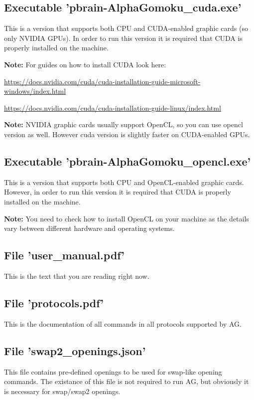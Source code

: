 \documentclass[12pt,a4paper]{article}
\begin{document}
\subsection{Executable 'pbrain-AlphaGomoku{\_}cuda.exe'}
This is a version that supports both CPU and CUDA-enabled graphic cards (so only NVIDIA GPUs). In order to run this version it is required that CUDA is properly installed on the machine.

\textbf{Note:} For guides on how to install CUDA look here:

\href{https://docs.nvidia.com/cuda/cuda-installation-guide-microsoft-windows/index.html}{https://docs.nvidia.com/cuda/cuda-installation-guide-microsoft-windows/index.html}

\href{https://docs.nvidia.com/cuda/cuda-installation-guide-linux/index.html}{https://docs.nvidia.com/cuda/cuda-installation-guide-linux/index.html}

\textbf{Note:} NVIDIA graphic cards usually support OpenCL, so you can use opencl version as well. However cuda version is slightly faster on CUDA-enabled GPUs.

\subsection{Executable 'pbrain-AlphaGomoku{\_}opencl.exe'}
This is a version that supports both CPU and OpenCL-enabled graphic cards. However, in order to run this version it is required that CUDA is properly installed on the machine.

\textbf{Note:} You need to check how to install OpenCL on your machine as the details vary between different hardware and operating systems.

\subsection{File 'user{\_}manual.pdf'}
This is the text that you are reading right now.

\subsection{File 'protocols.pdf'}
This is the documentation of all commands in all protocols supported by AG.

\subsection{File 'swap2{\_}openings.json'}
This file contains pre-defined openings to be used for swap-like opening commands. The existance of this file is not required to run AG, but obviously it is necessary for swap/swap2 openings.
\end{document}
